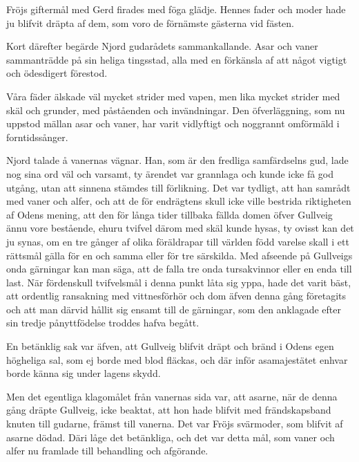 Fröjs giftermål med Gerd firades med föga glädje. Hennes fader och moder
hade ju blifvit dräpta af dem, som voro de förnämste gästerna vid
fästen.

Kort därefter begärde Njord gudarådets sammankallande. Asar och vaner
sammanträdde på sin heliga tingsstad, alla med en förkänsla af att något
vigtigt och ödesdigert förestod.

Våra fäder älskade väl mycket strider med vapen, men lika mycket strider
med skäl och grunder, med påståenden och invändningar. Den
öfverläggning, som nu uppstod mällan asar och vaner, har varit
vidlyftigt och noggrannt omförmäld i forntidssånger.

Njord talade å vanernas vägnar. Han, som är den fredliga samfärdselns
gud, lade nog sina ord väl och varsamt, ty ärendet var grannlaga och
kunde icke få god utgång, utan att sinnena stämdes till förlikning. Det
var tydligt, att han samrådt med vaner och alfer, och att de för
endrägtens skull icke ville bestrida riktigheten af Odens mening, att
den för långa tider tillbaka fällda domen öfver Gullveig ännu vore
bestående, ehuru tvifvel därom med skäl kunde hysas, ty ovisst kan det
ju synas, om en tre gånger af olika föräldrapar till världen född
varelse skall i ett rättsmål gälla för en och samma eller för tre
särskilda. Med afseende på Gullveigs onda gärningar kan man säga, att de
falla tre onda tursakvinnor eller en enda till last. När fördenskull
tvifvelsmål i denna punkt låta sig yppa, hade det varit bäst, att
ordentlig ransakning med vittnesförhör och dom äfven denna gång
företagits
och att man därvid hållit sig ensamt till de gärningar, som den
anklagade efter sin tredje pånyttfödelse troddes hafva begått.

En betänklig sak var äfven, att Gullveig blifvit dräpt och bränd i Odens
egen högheliga sal, som ej borde med blod fläckas, och där inför
asamajestätet enhvar borde känna sig under lagens skydd.

Men det egentliga klagomålet från vanernas sida var, att asarne, när de
denna gång dräpte Gullveig, icke beaktat, att hon hade blifvit med
frändskapsband knuten till gudarne, främst till vanerna. Det var Fröjs
svärmoder, som blifvit af asarne dödad. Däri låge det betänkliga, och
det var detta mål, som vaner och alfer nu framlade till behandling och
afgörande.


